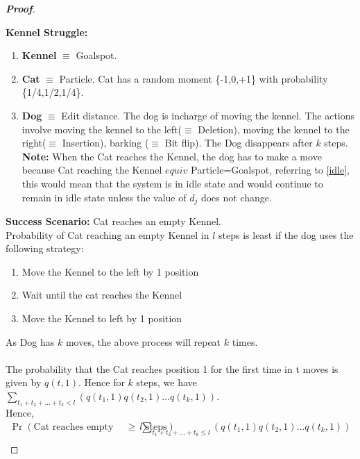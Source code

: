 \documentclass{article}
\begin{document}
\begin{proof}[\textbf{Proof}]
\begin{enumerate}
    \end{enumerate}

    \textbf{Kennel Struggle:} \\
    
    \begin{enumerate}
        \item \textbf{Kennel} $\equiv$ Goalspot.
        \item \textbf{Cat} $\equiv$ Particle. Cat has a random moment \{-1,0,+1\}
        with probability \{1/4,1/2,1/4\}.
        \item \textbf{Dog} $\equiv$ Edit distance. The dog is incharge of moving 
        the kennel. The actions involve moving the kennel to the left($\equiv$ 
        Deletion), moving the kennel to the right($\equiv$ Insertion), barking
        ($\equiv$ Bit flip). The Dog disappears after $k$ steps. 
        \textbf{Note:} When the Cat reaches the Kennel, the dog has to make a 
        move because Cat reaching the Kennel $equiv$ Particle=Goalspot, referring
        to \ref{idle}, this would mean that the system is in idle state and would
        continue to remain in idle state unless the value of $d_j$ does not 
        change.
    \end{enumerate}
    \textbf{Success Scenario:} Cat reaches an empty Kennel.\\
    Probability of Cat reaching an empty Kennel in $l$ steps is least if the dog
    uses the following strategy:\\
    \begin{enumerate}
        \item Move the Kennel to the left by 1 position
        \item Wait until the cat reaches the Kennel
        \item Move the Kennel to left by 1 position
    \end{enumerate}
    As Dog has $k$ 
    moves, the above process will repeat $k$ times.\\
    \\
    The probability that the Cat reaches position 1 for the first time in t moves is given by
    $q(t,1)$. Hence for $k$ steps, we have 
    $\sum_{t_1+t_2+...+t_k<l}^{}(q(t_1,1)q(t_2,1)...q(t_k,1))$.\\
    Hence,
    \begin{align}
        \Pr(\text{Cat reaches empty Kennel in atmost}l\text{ steps}) & ~\geq ~\sum_{t_1+t_2+...+t_k\leq l}^{}(q(t_1,1)q(t_2,1)...q(t_k,1)) \nonumber \\

\end{align}
\end{proof}
\end{document}
